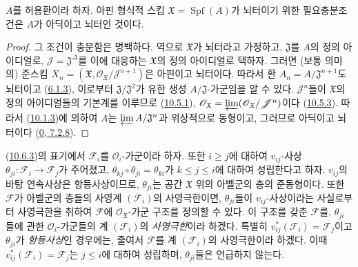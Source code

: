 \begin{corollary}[10.6.5]
\label{I.10.6.5-ko}
$A$를 허용환이라 하자. 아핀 형식적 스킴
$\mathfrak{X}=\operatorname{Spf}(A)$가 뇌터이기 위한 필요충분조건은
$A$가 아딕이고 뇌터인 것이다.
\end{corollary}

\begin{proof}
그 조건이 충분함은 명백하다. 역으로 $\mathfrak{X}$가 뇌터라고
가정하고, $\mathfrak{J}$를 $A$의 정의 아이디얼로,
$\mathscr{J}=\mathfrak{J}^\Delta$를 이에 대응하는
$\mathfrak{X}$의 정의 아이디얼로 택하자. 그러면 (보통 의미의) 준스킴
$X_n=(\mathfrak{X},
\mathscr{O}_{\mathfrak{X}}/\mathscr{J}^{n+1})$은 아핀이고 뇌터이다.
따라서 환 $A_n=A/\mathfrak{J}^{n+1}$도 뇌터이고
(\hyperref[I.6.1.3-ko]{6.1.3}), 이로부터
$\mathfrak{J}/\mathfrak{J}^2$가 유한 생성
$A/\mathfrak{J}$-가군임을 알 수 있다. $\mathscr{J}^n$들이
$\mathfrak{X}$의 정의 아이디얼들의 기본계를 이루므로
(\hyperref[I.10.5.1-ko]{10.5.1}),
$\mathscr{O}_{\mathfrak{X}}
=\varprojlim(\mathscr{O}_{\mathfrak{X}}/\mathscr{J}^n)$이다
(\hyperref[I.10.5.3-ko]{10.5.3}). 따라서
(\hyperref[I.10.1.3-ko]{10.1.3})에 의하여 $A$는
$\varprojlim A/\mathfrak{J}^n$과 위상적으로 동형이고, 그러므로
아딕이고 뇌터이다
(\hyperref[0.7.2.8-ko]{0, 7.2.8}).
\end{proof}

\begin{remark}[10.6.6]
\label{I.10.6.6-ko}
(\hyperref[I.10.6.3-ko]{10.6.3})의 표기에서
$\mathscr{F}_i$를 $\mathscr{O}_i$-가군이라 하자. 또한
$i\geq j$에 대하여 $v_{ij}$-사상
$\theta_{ji}:\mathscr{F}_i\to\mathscr{F}_j$가 주어졌고,
$\theta_{kj}\circ\theta_{ji}=\theta_{ki}$가
$k\leq j\leq i$에 대하여 성립한다고 하자. $v_{ij}$의 바탕 연속사상은
항등사상이므로, $\theta_{ji}$는 공간 $\mathfrak{X}$ 위의 아벨군의
층의 준동형이다. 또한 $\mathscr{F}$가 아벨군의 층들의 사영계
$(\mathscr{F}_i)$의 사영극한이면, $\theta_{ji}$들이
$v_{ij}$-사상이라는 사실로부터 사영극한을 취하여 $\mathscr{F}$에
$\mathscr{O}_{\mathfrak{X}}$-가군 구조를 정의할 수 있다. 이 구조를
갖춘 $\mathscr{F}$를, $\theta_{ji}$들에 관한
$\mathscr{O}_i$-가군들의 계 $(\mathscr{F}_i)$의
\emph{사영극한}이라 하겠다. 특별히
$v_{ij}^*(\mathscr{F}_i)=\mathscr{F}_j$이고 $\theta_{ji}$가
\emph{항등사상}인 경우에는, 줄여서 $\mathscr{F}$를 계
$(\mathscr{F}_i)$의 사영극한이라 하겠다. 이때
$v_{ij}^*(\mathscr{F}_i)=\mathscr{F}_j$는 $j\leq i$에 대하여
성립하며, $\theta_{ji}$들은 언급하지 않는다.
\end{remark}

